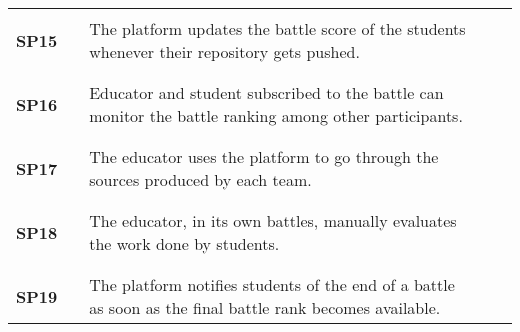 \begin{longtable}[H]{l l p{8.5cm} l l}
                   &        &                                                                                                                                   &        &                        \\\hline & & \\
    \textbf{SP15}  & \vline & The platform updates the battle score of the students whenever their repository gets pushed.                                      & \vline &                        \\
                   &        &                                                                                                                                   &        &                        \\\hline & & \\
    \textbf{SP16}  & \vline & Educator and student subscribed to the battle can monitor the battle ranking among other participants.                            & \vline &                        \\
                   &        &                                                                                                                                   &        &                        \\\hline & & \\
    \textbf{SP17}  & \vline & The educator uses the platform to go through the sources produced by each team.                                                   & \vline &                        \\
                   &        &                                                                                                                                   &        &                        \\\hline & & \\
    \textbf{SP18}  & \vline & The educator, in its own battles, manually evaluates the work done by students.                                                   & \vline &                        \\
                   &        &                                                                                                                                   &        &                        \\\hline & & \\
    \textbf{SP19}  & \vline & The platform notifies students of the end of a battle as soon as the final battle rank becomes available.                         & \vline &                        \\

\end{longtable}
